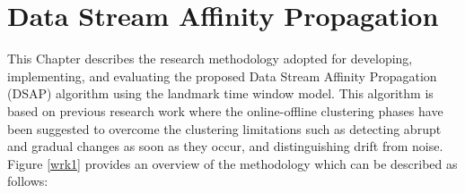 \setlength{\parindent}{2em}
% 

\chapter{Data Stream Affinity Propagation}



This Chapter describes the research methodology adopted for developing, implementing, and evaluating the proposed Data Stream Affinity Propagation (DSAP) algorithm using the landmark time window model. This algorithm is based on previous research work where the online-offline clustering phases have been suggested to overcome the clustering limitations such as detecting abrupt and gradual changes as soon as they occur, and distinguishing drift from noise. Figure \ref{wrk1} provides an overview of the methodology which can be described as follows:


